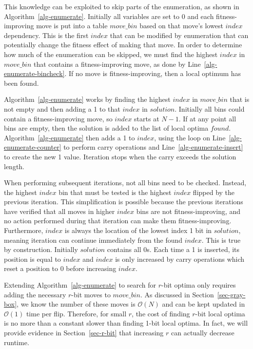 \documentclass[runningheads,a4paper]{llncs}
\newcommand{\BigO}[1]{$\mathcal{O}{(#1)}$}
\begin{document}
This knowledge can be exploited to skip parts of the enumeration,
as shown in Algorithm~\ref{alg-enumerate}.
Initially all variables are set to 0 and
each fitness-improving move is put into a table $move\_bin$
based on that move's lowest $index$ dependency. This is the first $index$ that
can be modified by enumeration that can potentially change the fitness effect of making that move.
In order to determine how much of the enumeration can be skipped, we must find
the highest $index$ in $move\_bin$ that contains a fitness-improving move,
as done by Line~\ref{alg-enumerate-bincheck}. If no move is fitness-improving,
then a local optimum has been found.

Algorithm~\ref{alg-enumerate} works by finding the highest $index$ in $move\_bin$
that is not empty and then adding a 1 to that $index$ in $solution$. Initially
all bins could contain a fitness-improving move, so $index$ starts at $N-1$.
If at any point all bins are empty, then the solution is added to the list of
local optima $found$. Algorithm~\ref{alg-enumerate} then
adds a 1 to $index$, using the loop on Line~\ref{alg-enumerate-counter}
to perform carry operations and Line~\ref{alg-enumerate-insert} to create the new 1 value.
Iteration stops when the carry exceeds the solution length.

When performing subsequent iterations, not all bins need to be checked. Instead, the highest $index$
bin that must be tested is the highest $index$ flipped by the previous iteration. This
simplification is possible because
the previous iterations have verified that all moves in higher $index$ bins are not fitness-improving, and no action performed during
that iteration can make them fitness-improving.
Furthermore, $index$ is always the location of the lowest index 1 bit in $solution$, meaning
iteration can continue immediately from the found $index$. This is true by construction.
Initially $solution$ contains all 0s. Each time a 1 is inserted, its position is equal to $index$ and
$index$ is only increased by carry operations which reset a position to 0 before increasing $index$.

Extending Algorithm~\ref{alg-enumerate} to search for $r$-bit optima only requires adding the
necessary $r$-bit moves to $move\_bin$. As discussed in Section~\ref{sec-gray-box}, we know the number of these moves
is \BigO{N} and can be kept updated in \BigO{1} time per flip. Therefore, for small $r$, the cost
of finding $r$-bit local optima is no more than a constant slower than finding 1-bit local optima.
In fact, we will provide evidence in Section~\ref{sec-r-bit} that increasing $r$ can actually
decrease runtime.
\end{document}
